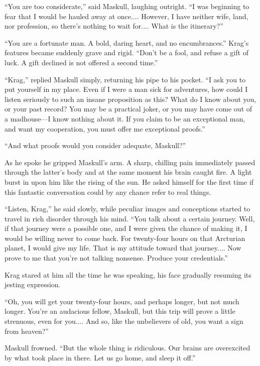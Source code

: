 ``You are too considerate,'' said Maskull, laughing outright. ``I was beginning to fear that I would be hauled away at once.... However, I have neither wife, land, nor profession, so there's nothing to wait for.... What is the itinerary?''

``You are a fortunate man. A bold, daring heart, and no encumbrances.'' Krag's features became suddenly grave and rigid. ``Don't be a fool, and refuse a gift of luck. A gift declined is not offered a second time.''

``Krag,'' replied Maskull simply, returning his pipe to his pocket. ``I ask you to put yourself in my place. Even if I were a man sick for adventures, how could I listen seriously to such an insane proposition as this? What do I know about you, or your past record? You may be a practical joker, or you may have come out of a madhouse—I know nothing about it. If you claim to be an exceptional man, and want my cooperation, you must offer me exceptional proofs.''

``And what proofs would you consider adequate, Maskull?''

As he spoke he gripped Maskull's arm. A sharp, chilling pain immediately passed through the latter's body and at the same moment his brain caught fire. A light burst in upon him like the rising of the sun. He asked himself for the first time if this fantastic conversation could by any chance refer to real things.

``Listen, Krag,'' he said slowly, while peculiar images and conceptions started to travel in rich disorder through his mind. ``You talk about a certain journey. Well, if that journey were a possible one, and I were given the chance of making it, I would be willing never to come back. For twenty-four hours on that Arcturian planet, I would give my life. That is my attitude toward that journey.... Now prove to me that you're not talking nonsense. Produce your credentials.''

Krag stared at him all the time he was speaking, his face gradually resuming its jesting expression.

``Oh, you will get your twenty-four hours, and perhaps longer, but not much longer. You're an audacious fellow, Maskull, but this trip will prove a little strenuous, even for you.... And so, like the unbelievers of old, you want a sign from heaven?''

Maskull frowned. ``But the whole thing is ridiculous. Our brains are overexcited by what took place in there. Let us go home, and sleep it off.''

